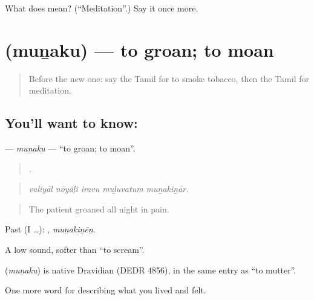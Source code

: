 \begin{tcolorbox}[breakable,colback=teal!4,colframe=teal!35!black,title={Before you move on}]
What does  mean? (\textquotedblleft{}Meditation\textquotedblright{}.) Say it once more.
\end{tcolorbox}
\section[\texorpdfstring{\ta{முனகு} (muṉaku)}{முனகு (muṉaku)}]{ (muṉaku) — to groan; to moan}

\label{lesson:TA-C491-munaku}



\begin{quote}
Before the new one: say the Tamil for to smoke tobacco, then the Tamil for meditation.
\end{quote}

\subsection*{You'll want to know: }
\textbf{} — \emph{muṉaku} — \textquotedblleft{}to groan; to moan\textquotedblright{}.

\begin{quote}
    .
\end{quote}

\begin{quote}
\emph{valiyāl nōyāḷi iravu muḻuvatum muṉakiṉār.}
\end{quote}

\begin{quote}
The patient groaned all night in pain.
\end{quote}

Past (I …): , \emph{muṉakiṉēṉ}.

A low sound, softer than  \textquotedblleft{}to scream\textquotedblright{}.

\begin{cousinweb}
\textbf{} (\emph{muṉaku}) is native Dravidian (DEDR 4856), in the same entry as  \textquotedblleft{}to mutter\textquotedblright{}.
\end{cousinweb}

\begin{grammarlens}[title={What you've built}]
One more word for describing what you lived and felt.
\end{grammarlens}

